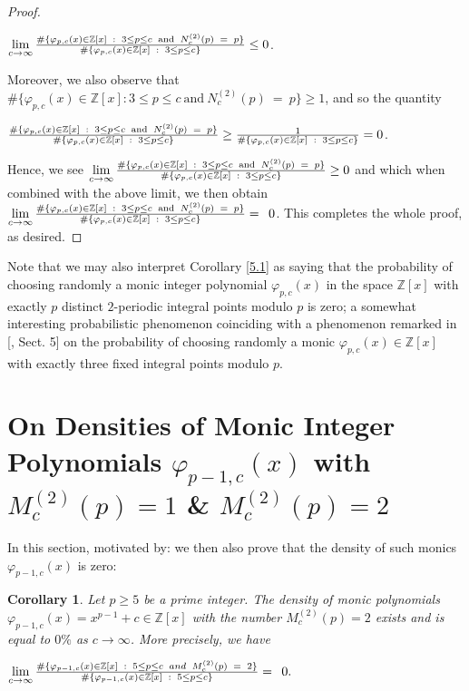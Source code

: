 \documentclass{article}
\theoremstyle{plain}
\newtheorem{cor}[thm]{Corollary}
\theoremstyle{definition}
\begin{document}
\begin{proof}
\begin{center}
$\lim\limits_{c\to\infty} \Large{\frac{\# \{\varphi_{p,c}(x)\in \mathbb{Z}[x] \ : \ 3\leq p\leq c \ \text{and} \ N_{c}^{(2)}(p) \ = \ p\}}{\Large{\# \{\varphi_{p,c}(x) \in \mathbb{Z}[x] \ : \ 3\leq p\leq c \}}}} \leq 0$.
\end{center}Moreover, we also observe that $\# \{\varphi_{p,c}(x)\in \mathbb{Z}[x] : 3\leq p\leq c \ \text{and} \ N_{c}^{(2)}(p) \ = \ p\}\geq 1$, and so the quantity 
\begin{center}
$\Large{\frac{\# \{\varphi_{p,c}(x) \in \mathbb{Z}[x] \ : \ 3\leq p\leq c \ \text{and} \ N_{c}^{(2)}(p) \ = \ p\}}{\Large{\# \{\varphi_{p,c}(x) \in \mathbb{Z}[x] \ : \ 3\leq p\leq c \}}}}\geq \frac{1}{\# \{\varphi_{p,c}(x) \in \mathbb{Z}[x] \ : \ 3\leq p\leq c \}} = 0$.
\end{center}Hence, we see $\lim\limits_{c\to\infty} \Large{\frac{\# \{\varphi_{p,c}(x) \in \mathbb{Z}[x] \ : \ 3\leq p\leq c \ \text{and} \ N_{c}^{(2)}(p) \ = \ p\}}{\Large{\# \{\varphi_{p,c}(x) \in \mathbb{Z}[x] \ : \ 3\leq p\leq c \}}}} \geq 0$ and which when combined with the above limit, we then obtain $\lim\limits_{c\to\infty} \Large{\frac{\# \{\varphi_{p,c}(x) \in \mathbb{Z}[x] \ : \ 3\leq p\leq c \ \text{and} \ N_{c}^{(2)}(p) \ = \ p\}}{\Large{\# \{\varphi_{p,c}(x) \in \mathbb{Z}[x] \ : \ 3\leq p\leq c \}}}} = \ 0$. This completes the whole proof, as desired. 
\end{proof}\noindent Note that we may also interpret Corollary \ref{5.1} as saying that the probability of choosing randomly a monic integer polynomial $\varphi_{p,c}(x)$ in the space $\mathbb{Z}[x]$ with exactly $p$ distinct $2$-periodic integral points modulo $p$ is zero; a somewhat interesting probabilistic phenomenon coinciding with a phenomenon remarked in [\cite{BK1}, Sect. 5] on the probability of choosing randomly a monic $\varphi_{p,c}(x)\in \mathbb{Z}[x]$ with exactly three fixed integral points modulo $p$.

\section{On Densities of Monic Integer Polynomials $\varphi_{p-1,c}(x)$ with $M_{c}^{(2)}(p) = 1$ \& $M_{c}^{(2)}(p) = 2$}\label{sec6}

In this section, motivated by: we then also prove that the density of such monics $\varphi_{p-1,c}(x)$ is zero:
\begin{cor}\label{6.1}
Let $p\geq 5$ be a prime integer. The density of monic polynomials $\varphi_{p-1,c}(x)=x^{p-1}+c\in \mathbb{Z}[x]$ with the number $M_{c}^{(2)}(p) = 2$ exists and is equal to $0\%$ as $c\to \infty$. More precisely, we have 
\begin{center}
    $\lim\limits_{c\to\infty} \Large{\frac{\# \{\varphi_{p-1,c}(x) \in \mathbb{Z}[x]\ : \ 5\leq p\leq c \ and \ M_{c}^{(2)}(p) \ = \ 2\}}{\Large{\# \{\varphi_{p-1,c}(x) \in \mathbb{Z}[x]\ : \ 5\leq p\leq c \}}}} = \ 0.$
\end{center}
\end{cor}
\end{document}

